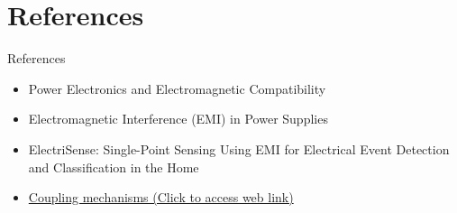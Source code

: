 \documentclass{beamer}
\begin{document}
\section{References} 
\begin{frame}{References}
\begin{itemize}
\item Power Electronics and Electromagnetic Compatibility 
\item Electromagnetic Interference (EMI) in 
Power Supplies
\item ElectriSense: Single-Point Sensing Using EMI for Electrical Event Detection and Classification in the Home
\item \href{http://www.electrical-installation.org/enwiki/EMC_-_Coupling_mechanisms_and_counter-measures}{Coupling mechanisms (Click to access web link)}
\end{itemize}
\end{frame}
\end{document}

